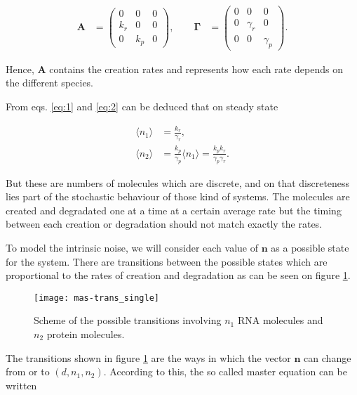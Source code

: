 \begin{eqnarray}
  \mathbf{A} &=
  \begin{pmatrix}
    0 & 0 & 0 \\
    k_r & 0 & 0 \\
    0 & k_p & 0
  \end{pmatrix},\quad \quad
  \mathbf{\Gamma} &=
  \begin{pmatrix}
    0 & 0 & 0 \\
    0 & \gamma_r & 0 \\
    0 & 0 & \gamma_p
  \end{pmatrix}.
\end{eqnarray}

Hence, $\mathbf{A}$ contains the creation rates and represents how each rate depends on the different species.

From eqs. \ref{eq:1} and \ref{eq:2} can be deduced that on steady state

\begin{align}
  \langle n_1 \rangle &= \frac{k_r}{\gamma_r}, \label{eq:ssr} \\
  \langle n_2 \rangle &= \frac{k_p}{\gamma_p} \langle n_1 \rangle = \frac{k_pk_r}{\gamma_p\gamma_r} \label{eq:ssp}.
\end{align}

But these are numbers of molecules which are discrete, and on that discreteness lies part of the stochastic behaviour of those kind of systems. The molecules are created and degradated one at a time at a certain average rate but the timing between each creation or degradation should not match exactly the rates. 

To model the intrinsic noise, we will consider each value of $\mathbf{n}$ as a possible state for the system. There are transitions between the possible states which are proportional to the rates of creation and degradation as can be seen on figure \ref{fig:mas-trans_single}.

\begin{figure}[H]
  \centering
  \texttt{[image: mas-trans\_single]}
  \caption[Transitions between states for a single gene]{\label{fig:mas-trans_single} Scheme of the possible transitions involving $n_1$ RNA molecules and $n_2$ protein molecules.}
\end{figure}

The transitions shown in figure \ref{fig:mas-trans_single} are the ways in which the vector $\mathbf{n}$ can change from or to $(d,n_1,n_2)$. According to this, the so called master equation can be written

